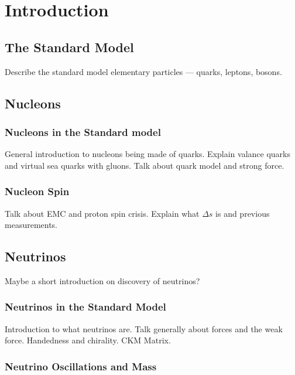 \section{Introduction} \label{intro}
\hspace{\parindent}

\subsection{The Standard Model}
  Describe the standard model elementary particles --- quarks, leptons, bosons.

\subsection{Nucleons}\label{nucleonintro}
  \subsubsection{Nucleons in the Standard model}
  General introduction to nucleons being made of quarks. Explain valance quarks
  and virtual sea quarks with gluons.  Talk about quark model and strong force.
  \subsubsection{Nucleon Spin}
  Talk about EMC and proton spin crisis.  Explain what $\Delta s$ is and
  previous measurements.

\subsection{Neutrinos}\label{neutrinointro}
  Maybe a short introduction on discovery of neutrinos?
  \subsubsection{Neutrinos in the Standard Model}
    Introduction to what neutrinos are. Talk generally about forces and the
    weak force.  Handedness and chirality. CKM Matrix.
  \subsubsection{Neutrino Oscillations and Mass}

